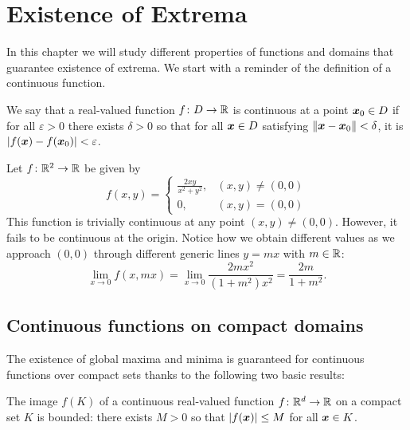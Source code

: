 
\chapter{Existence of Extrema}\label{chapter:existence}

In this chapter we will study different properties of functions and domains that guarantee existence of extrema. We start with a reminder of the definition of a continuous function.
\begin{definition}\label{def:continuous}
We say that a real-valued function $f\colon D \to \mathbb{R}$ is continuous at a point $\boldsymbol{x}_0 \in D$ if for all $\varepsilon > 0$ there exists $\delta > 0$ so that for all $\boldsymbol{x} \in D$ satisfying $\lVert \boldsymbol{x}-\boldsymbol{x}_0 \rVert<\delta$, it is $\lvert  f(\boldsymbol{x}) - f(\boldsymbol{x}_0)  \rvert < \varepsilon$.  
\end{definition}

\begin{example}
Let $f\colon \mathbb{R}^2 \to \mathbb{R}$ be given by
\begin{equation*}
f(x,y) = \begin{cases}
\frac{2xy}{x^2+y^2}, &(x,y) \neq (0,0) \\
0, &(x,y)=(0,0)
\end{cases}
\end{equation*}
This function is trivially continuous at any point $(x,y)\neq(0,0)$.  However, it fails to be continuous at the origin.  Notice how we obtain different values as we approach $(0,0)$ through different generic lines $y=mx$ with $m \in \mathbb{R}$:
\begin{equation*}
\lim_{x\to 0} f(x,mx) = \lim_{x \to 0} \frac{2mx^2}{(1+m^2)x^2} = \frac{2m}{1+m^2}.
\end{equation*}
\end{example}

\section{Continuous functions on compact domains}
The existence of global maxima and minima is guaranteed for continuous functions over compact sets thanks to the following two basic results:

\begin{theorem}\label{theorem:BVT}
The image $f(K)$ of a continuous real-valued function $f \colon \mathbb{R}^d \to \mathbb{R}$ on a compact set $K$ is bounded: there exists $M>0$ so that $\lvert  f(\boldsymbol{x})  \rvert \leq M$ for all $\boldsymbol{x} \in K$.
\end{theorem}

